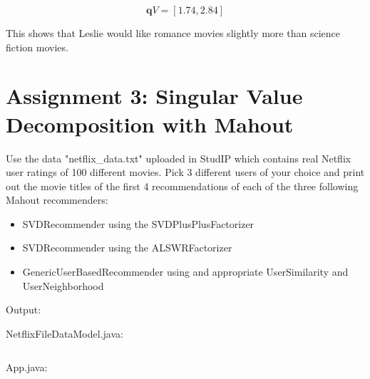 \documentclass{article}
\begin{document}
\[
\mathbf{q}V = [1.74,2.84]
\]

This shows that Leslie would like romance movies slightly more than science fiction movies.

\section{Assignment 3: Singular Value Decomposition with Mahout}
Use the data "netflix\_data.txt" uploaded in StudIP which contains real Netflix user ratings of 100 different movies. Pick 3 different users of your choice and print out the movie titles of the first 4 recommendations of each of the three following Mahout recommenders:
\begin{itemize}
	\item SVDRecommender using the SVDPlusPlusFactorizer
	\item SVDRecommender using the ALSWRFactorizer
	\item GenericUserBasedRecommender using and appropriate UserSimilarity and UserNeighborhood
\end{itemize}

Output:


NetflixFileDataModel.java:
\inputminted[breaklines=true]{java}{NetflixFileDataModel.java}

App.java:
\inputminted[breaklines=true]{java}{App.java}
\end{document}
